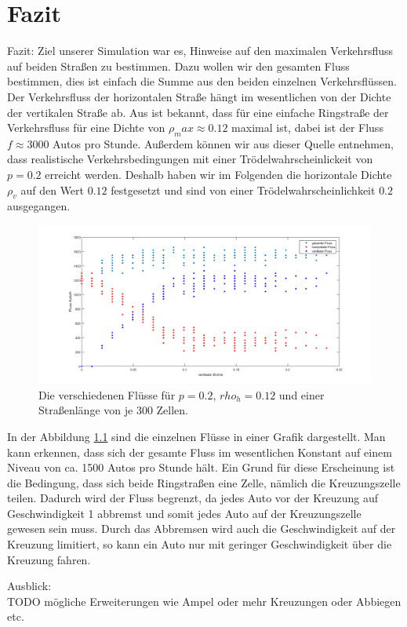 \chapter{Fazit}

Fazit: Ziel unserer Simulation war es, Hinweise auf den maximalen Verkehrsfluss auf beiden Straßen zu bestimmen. Dazu wollen wir den gesamten Fluss bestimmen, dies ist einfach die Summe aus den beiden einzelnen Verkehrsflüssen.\\

Der Verkehrsfluss der horizontalen Straße hängt im wesentlichen von der Dichte der vertikalen Straße ab. Aus \cite{book:bungartz} ist bekannt, dass für eine einfache Ringstraße der Verkehrsfluss für eine Dichte von $\rho_max \approx 0.12$ maximal ist, dabei ist der Fluss $f \approx 3000$ Autos pro Stunde. Außerdem können wir aus dieser Quelle entnehmen, dass realistische Verkehrsbedingungen mit einer Trödelwahrscheinlickeit von $p=0.2$ erreicht werden. Deshalb haben wir im Folgenden die horizontale Dichte $\rho_v$ auf den Wert $0.12$ festgesetzt und sind von einer Trödelwahrscheinlichkeit $0.2$ ausgegangen. 
%
\begin{figure}[h]%
\centering
\includegraphics[width=17cm]{MaxFluss.png}%
\caption{Die verschiedenen Flüsse für $p=0.2$, $rho_h=0.12$ und einer Straßenlänge von je 300 Zellen.  }%
\label{pic:MaxFluss}%
\end{figure}
%
In der Abbildung \ref{pic:MaxFluss} sind die einzelnen Flüsse in einer Grafik dargestellt. Man kann erkennen, dass sich der gesamte Fluss im wesentlichen Konstant auf einem Niveau von ca. 1500 Autos pro Stunde hält. Ein Grund für diese Erscheinung ist die Bedingung, dass sich beide Ringstraßen eine Zelle, nämlich die Kreuzungszelle teilen. Dadurch wird der Fluss begrenzt, da jedes Auto vor der Kreuzung auf Geschwindigkeit 1 abbremst und somit jedes Auto auf der Kreuzungszelle gewesen sein muss. Durch das Abbremsen wird auch die Geschwindigkeit auf der Kreuzung limitiert, so kann ein Auto nur mit geringer Geschwindigkeit über die Kreuzung fahren.

Ausblick:\\
TODO mögliche Erweiterungen wie Ampel oder mehr Kreuzungen oder Abbiegen etc.
